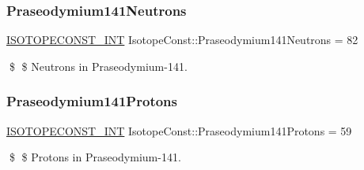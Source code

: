 \subsubsection{\texorpdfstring{Praseodymium141\+Neutrons}{Praseodymium141Neutrons}}
{\footnotesize\ttfamily \mbox{\hyperlink{group___isotope_const-_macros_ga5f18360b3e99483a35c32d789e62621c}{I\+S\+O\+T\+O\+P\+E\+C\+O\+N\+S\+T\+\_\+\+I\+NT}} Isotope\+Const\+::\+Praseodymium141\+Neutrons = 82}

\$ \$ Neutrons in Praseodymium-\/141. \mbox{\label{group___isotope_const-_praseodymium-_pr141_ga1ad7160162a9d5f2d5c766585204341e}} 
\subsubsection{\texorpdfstring{Praseodymium141\+Protons}{Praseodymium141Protons}}
{\footnotesize\ttfamily \mbox{\hyperlink{group___isotope_const-_macros_ga5f18360b3e99483a35c32d789e62621c}{I\+S\+O\+T\+O\+P\+E\+C\+O\+N\+S\+T\+\_\+\+I\+NT}} Isotope\+Const\+::\+Praseodymium141\+Protons = 59}

\$ \$ Protons in Praseodymium-\/141. 